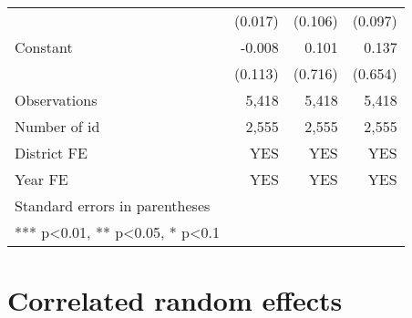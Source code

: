 \documentclass[
]{article}
\begin{document}
\begin{landscape}
\begin{longtable}[t]{lrrr}
 & (0.017) & (0.106) & (0.097)\\
Constant & -0.008 & 0.101 & 0.137\\
 & (0.113) & (0.716) & (0.654)\\
Observations & 5,418 & 5,418 & 5,418\\
\addlinespace
Number of id & 2,555 & 2,555 & 2,555\\
District FE & YES & YES & YES\\
Year FE & YES & YES & YES\\
Standard errors in parentheses &  &  & \\
*** p<0.01, ** p<0.05, * p<0.1 &  &  & \\*
\end{longtable}
\endgroup{}
\end{landscape}

\newpage

\hypertarget{correlated-random-effects}{%
\section{Correlated random effects}\label{correlated-random-effects}}
\end{document}
